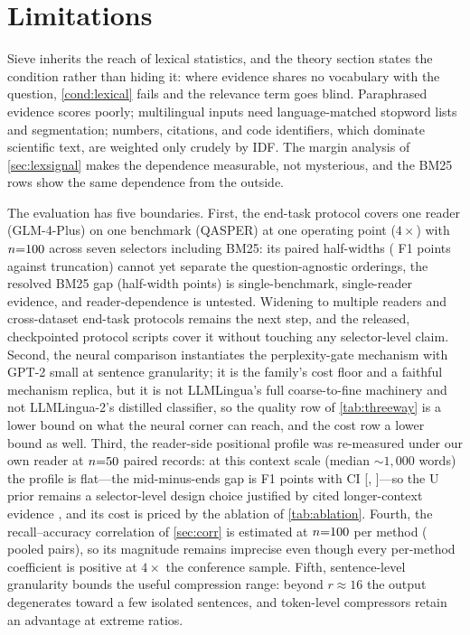 \documentclass[preprint,12pt]{elsarticle}
\theoremstyle{remark}
\newcommand{\method}{Sieve}
\begin{document}
\section{Limitations}
\label{sec:limitations}
\method{} inherits the reach of lexical statistics, and the theory
section states the condition rather than hiding it: where evidence
shares no vocabulary with the question, \autoref{cond:lexical} fails
and the relevance term goes blind. Paraphrased evidence scores poorly;
multilingual inputs need language-matched stopword lists and
segmentation; numbers, citations, and code identifiers, which
dominate scientific text, are weighted only crudely by IDF. The
margin analysis of \autoref{sec:lexsignal} makes the dependence
measurable, not mysterious, and the BM25 rows show the same
dependence from the outside.

The evaluation has five boundaries. First, the end-task protocol
covers one reader (GLM-4-Plus) on one benchmark (QASPER) at one
operating point ($4\times$) with $n{=}100$ across seven selectors
including BM25: its paired half-widths (\QAPairSHHW{} F1 points
against truncation) cannot yet separate the question-agnostic
orderings, the resolved BM25 gap (half-width \QAPairSBmHW{} points)
is single-benchmark, single-reader evidence, and reader-dependence is
untested. Widening to multiple readers and cross-dataset end-task
protocols remains the next step, and the released, checkpointed
protocol scripts cover it without touching any selector-level claim. Second, the
neural comparison instantiates the perplexity-gate mechanism with
GPT-2 small at sentence granularity; it is the family's cost floor
and a faithful mechanism replica, but it is not LLMLingua's full
coarse-to-fine machinery and not LLMLingua-2's distilled classifier,
so the quality row of \autoref{tab:threeway} is a lower bound on what
the neural corner can reach, and the cost row a lower bound as well.
Third, the reader-side positional profile was re-measured under our
own reader at $n{=}50$ paired records: at this context
scale (median ${\sim}1{,}000$ words) the profile is flat---the
mid-minus-ends gap is \PosRUGap{} F1 points with CI
[\PosRUGapLo, \PosRUGapHi]---so the U prior remains a
selector-level design choice justified by cited longer-context
evidence \citep{liu2023lost}, and its cost is priced by the
ablation of \autoref{tab:ablation}. Fourth, the
recall--accuracy correlation of \autoref{sec:corr} is estimated at
$n{=}100$ per method (\CorrNPairs{} pooled pairs), so its magnitude
remains imprecise even though every per-method coefficient is
positive at $4\times$ the conference sample. Fifth, sentence-level
granularity bounds the useful compression range: beyond
$r \approx 16$ the output degenerates toward a few isolated
sentences, and token-level compressors retain an advantage at extreme
ratios.
\end{document}
